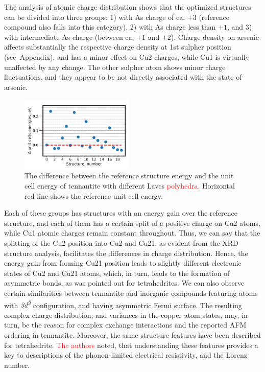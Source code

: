 \documentclass[preprint,review,12pt]{elsarticle}
\begin{document}
The analysis  of atomic charge distribution shows that the optimized structures can be divided into three groups: 1) with As charge of ca. $+3$ (reference compound also falls into this category), 2) with As charge less than $+1$, and 3) with intermediate As charge (between ca. $+1$ and $+2$).
Charge density on arsenic affects substantially the respective charge density at 1st sulpher position (see~Appendix), and has a minor effect on Cu2 charges, while Cu1 is virtually unaffected by any change.
The other sulpher atom shows minor charge fluctuations, and they appear to be not directly associated with the state of arsenic.

\begin{figure}
\centering
 \includegraphics[width=0.48\textwidth]{energy_structure_rescale_ri}
 \caption{\label{fig:energy_structure_rescale} The difference between the reference structure energy and the unit cell energy of tennantite with different Laves \textcolor{red}{polyhedra}. Horizontal red line shows the reference unit cell energy. }
\end{figure}

Each of these groups has structures with an energy gain over the reference structure, and each of them has a certain split of a positive charge on Cu2 atoms, while Cu1 atomic charges remain constant throughout.
Thus, we can say that the splitting of the Cu2 position into Cu2 and Cu21, as evident from the XRD structure analysis, facilitates the differences in charge distribution.
Hence, the energy gain from forming Cu21 position leads to slightly different electronic states of Cu2 and Cu21 atoms, which, in turn, leads to the formation of asymmetric bonds, as was pointed out for tetrahedrites\cite{Lai2015,Long2020}.
We can also observe certain similarities between tennantite and inorganic compounds featuring atoms with  {\it 3d\textsuperscript{9}}  configuration, and having asymmetric Fermi surface.
The resulting complex charge distribution, and variances in the copper atom states, may, in turn, be the reason for complex exchange interactions and the reported AFM ordering\cite{yaroslavzev2019} in tennantite.
Moreover, the same structure features have been described for tetrahedrite\cite{DiPaola2020}.
\textcolor{red}{The authors} noted, that understanding these features provides a key to descriptions of the phonon-limited electrical resistivity, and the Lorenz number.
\end{document}
